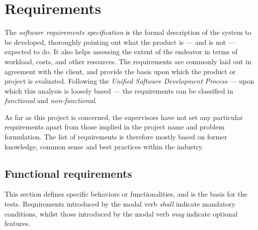 \section{Requirements}
The \emph{software requirements specification} is the formal description of the system to be developed, thoroughly pointing out what the product is --- and is not --- expected to do.
It also helps assessing the extent of the endeavor in terms of workload, costs, and other resources.
The requirements are commonly laid out in agreement with the client, and provide the basis upon which the product or project is evaluated.
Following the \emph{Unified Software Development Process} --- upon which this analysis is loosely based --- the requirements can be classified in \emph{functional} and \emph{non-functional}.

As far as this project is concerned, the supervisors have not set any particular requirements apart from those implied in the project name and problem formulation.
The list of requirements is therefore mostly based on former knowledge, common sense and best practices within the industry.


\subsection{Functional requirements}\label{subsec:req_func}
This section defines specific behaviors or functionalities, and is the basis for the tests.
Requirements introduced by the modal verb \emph{shall} indicate mandatory conditions, whilst those introduced by the modal verb \emph{may} indicate optional features.

